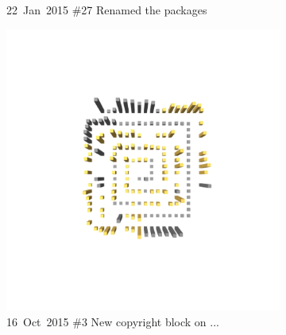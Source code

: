 \begin{figure}[ht]
\begin{subfigure}{0.32\textwidth}
        \caption{\mbox{22 Jan 2015}  \hfill  \linebreak  \#27 Renamed the packages} 
        \label{fig:JetUML_V0S5}
    \end{subfigure}
    \hspace*{\fill}
    \begin{subfigure}{0.32\textwidth}
        \includegraphics[width=\linewidth]{JetUML_V0S6.png}
        \caption{\mbox{16 Oct 2015}  \hfill  \linebreak  \#3 New copyright block on ...} 
        \label{fig:JetUML_V0S6}
    \end{subfigure}
    \hspace*{\fill}
    \medskip
    \begin{subfigure}{0.32\textwidth}

\end{subfigure}
\end{figure}
